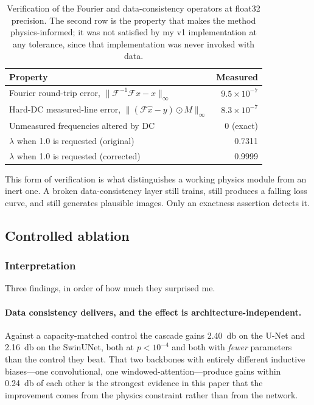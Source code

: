 \documentclass[11pt]{article}
\begin{document}
\begin{table}[h]
\centering
\small
\begin{tabular}{@{}lr@{}}
\toprule
Property & Measured \\
\midrule
Fourier round-trip error, $\|\mathcal{F}^{-1}\mathcal{F}x - x\|_\infty$ & $9.5\times10^{-7}$ \\
Hard-DC measured-line error, $\|(\mathcal{F}\hat{x} - y)\odot M\|_\infty$ & $8.3\times10^{-7}$ \\
Unmeasured frequencies altered by DC & 0 (exact) \\
$\lambda$ when \num{1.0} is requested (original) & 0.7311 \\
$\lambda$ when \num{1.0} is requested (corrected) & 0.9999 \\
\bottomrule
\end{tabular}
\caption{Verification of the Fourier and data-consistency operators at float32
precision. The second row is the property that makes the method
physics-informed; it was not satisfied by my v1 implementation at any
tolerance, since that implementation was never invoked with data.}
\label{tab:verification}
\end{table}

This form of verification is what distinguishes a working physics module from an
inert one. A broken data-consistency layer still trains, still produces a
falling loss curve, and still generates plausible images. Only an exactness
assertion detects it.

\subsection{Controlled ablation}
\label{sec:ablation}



\subsubsection{Interpretation}

Three findings, in order of how much they surprised me.

\paragraph{Data consistency delivers, and the effect is
architecture-independent.} Against a capacity-matched control the cascade gains
\SI{+2.40}{\decibel} on the U-Net and \SI{+2.16}{\decibel} on the SwinUNet, both
at $p < 10^{-4}$ and both with \emph{fewer} parameters than the control they
beat. That two backbones with entirely different inductive biases---one
convolutional, one windowed-attention---produce gains within
\SI{0.24}{\decibel} of each other is the strongest evidence in this paper that
the improvement comes from the physics constraint rather than from the network.
\end{document}

